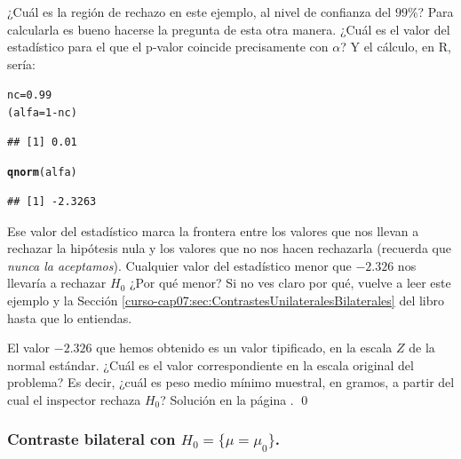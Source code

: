 \documentclass[10pt,a4paper]{article}\usepackage[]{graphicx}\usepackage[]{color}
\makeatletter
\newcommand{\hlnum}[1]{\textcolor[rgb]{0.686,0.059,0.569}{#1}}%
\newcommand{\hlopt}[1]{\textcolor[rgb]{0,0,0}{#1}}%
\newcommand{\hlstd}[1]{\textcolor[rgb]{0.345,0.345,0.345}{#1}}%
\newcommand{\hlkwb}[1]{\textcolor[rgb]{0.69,0.353,0.396}{#1}}%
\newcommand{\hlkwd}[1]{\textcolor[rgb]{0.737,0.353,0.396}{\textbf{#1}}}%
\newenvironment{kframe}{%
 \def\at@end@of@kframe{}%
 \ifinner\ifhmode%
  \def\at@end@of@kframe{\end{minipage}}%
  \begin{minipage}{\columnwidth}%
 \fi\fi%
 \def\FrameCommand##1{\hskip\@totalleftmargin \hskip-\fboxsep
 \colorbox{shadecolor}{##1}\hskip-\fboxsep
     \hskip-\linewidth \hskip-\@totalleftmargin \hskip\columnwidth}%
 \MakeFramed {\advance\hsize-\width
   \@totalleftmargin\z@ \linewidth\hsize
   \@setminipage}}%
 {\par\unskip\endMakeFramed%
 \at@end@of@kframe}
\newenvironment{knitrout}{}{} %
\makeatother
\begin{document}
¿Cuál es la región de rechazo en este ejemplo, al nivel de confianza del $99$\%? Para calcularla es bueno hacerse la pregunta de esta otra manera. ¿Cuál es el valor del estadístico para el que el p-valor coincide precisamente con $\alpha$? Y el cálculo, en R, sería:
\begin{knitrout}
\color{fgcolor}\begin{kframe}
\begin{alltt}
\hlstd{nc} \hlkwb{=} \hlnum{0.99}
\hlstd{(alfa} \hlkwb{=} \hlnum{1} \hlopt{-} \hlstd{nc)}
\end{alltt}
\begin{verbatim}
## [1] 0.01
\end{verbatim}
\begin{alltt}
\hlkwd{qnorm}\hlstd{(alfa)}
\end{alltt}
\begin{verbatim}
## [1] -2.3263
\end{verbatim}
\end{kframe}
\end{knitrout}
Ese valor del estadístico marca la frontera entre los valores que nos llevan a rechazar la hipótesis nula y los valores que no nos hacen rechazarla (recuerda que {\em nunca la aceptamos}).  Cualquier valor del estadístico menor que $\ensuremath{-2.326}$ nos llevaría a rechazar $H_0$ ¿Por qué menor? Si no ves claro por qué, vuelve a leer este ejemplo y la Sección \ref{curso-cap07:sec:ContrastesUnilateralesBilaterales} del libro hasta que lo entiendas.

\begin{ejercicio}
\label{tut07:ejercicio05}
El valor $\ensuremath{-2.326}$ que hemos obtenido es un valor tipificado, en la escala $Z$ de la normal estándar.  ¿Cuál es el valor correspondiente en la escala original del problema? Es decir, ¿cuál es peso medio mínimo muestral, en gramos, a partir del cual el inspector rechaza $H_0$? Solución en la página \pageref{tut07:ejercicio05:sol}.
\qed
\end{ejercicio}

\subsubsection{Contraste bilateral con $H_0=\{\mu = \mu_0\}$.}
\end{document}
